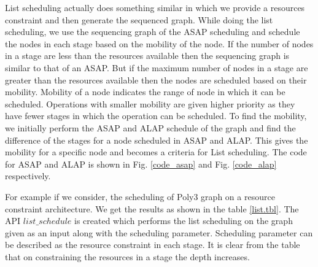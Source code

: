 


List scheduling actually does something similar in which we provide a resources constraint and then generate the sequenced graph. 
While doing the list scheduling, we use the sequencing graph of the ASAP scheduling and schedule the nodes in each stage based on the mobility of the node.
If the number of nodes in a stage are less than the resources available then the sequencing graph is similar to that of an ASAP. But if the maximum number of nodes in a stage are greater than the resources available then the nodes are scheduled based on their mobility. 
Mobility of a node indicates the range of node in which it can be scheduled. Operations with smaller mobility are given higher priority as they have fewer stages in which the operation can be scheduled. To find the mobility, we initially perform the ASAP and ALAP schedule of the graph and find the difference of the stages for a node scheduled in ASAP and ALAP. This gives the mobility for a specific node and becomes a criteria for List scheduling. The code for ASAP and ALAP is shown in Fig. \ref{code_asap} and Fig. \ref{code_alap} respectively. 


%





For example if we consider, the scheduling of Poly3 graph on a resource constraint architecture. We get the results as shown in the table \ref{list.tbl}. The API $list\_schedule$ is created which performs the list scheduling on the graph given as an input along with the scheduling parameter. Scheduling parameter can be described as the resource constraint in each stage. It is clear from the table that on constraining the resources in a stage the depth increases.

